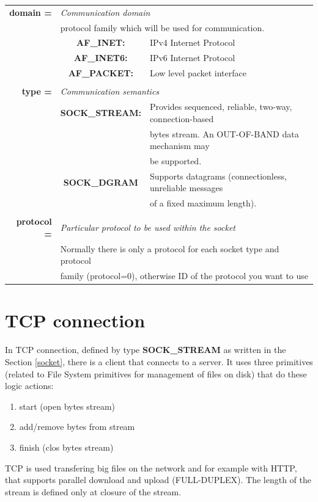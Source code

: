 \begin{table}[h]
\centering
\begin{tabular}{rcl}
\textbf{domain =} & \multicolumn{2}{l}{\textit{Communication domain}}\\
{} & \multicolumn{2}{l}{protocol family which will be used for communication.}\\
{} & \textbf{AF\_INET:} & {IPv4 Internet Protocol}\\
{} & \textbf{AF\_INET6:} & {IPv6 Internet Protocol}\\
{} & \textbf{AF\_PACKET:} & {Low level packet interface}\\
& &\\
\textbf{type =} & \multicolumn{2}{l}{\textit{Communication semantics}}\\
{} & \textbf{SOCK\_STREAM:} & {Provides sequenced, reliable, two-way, connection-based}\\
{} & {} & {bytes stream. An OUT-OF-BAND data mechanism may}\\
{} & {} & {be supported.}\\
{} & \textbf{SOCK\_DGRAM} & {Supports datagrams (connectionless, unreliable messages} \\
& & {of a fixed maximum length).}\\
& & \\
\textbf{protocol =} & \multicolumn{2}{l}{\textit{Particular protocol to be used within the socket}}\\
{} & \multicolumn{2}{l}{Normally there is only a protocol for each socket type and protocol}\\
{} & \multicolumn{2}{l}{family (protocol=0), otherwise ID of the protocol you want to use}\\
\end{tabular}
\end{table}

\vspace{10cm}
\section{TCP connection}
In TCP connection, defined by type \textbf{SOCK\_STREAM} as written in the Section \ref{socket}, there is a client that connects to a server. It uses three primitives (related to File System primitives for management of files on disk) that do these logic actions:
\begin{enumerate}
\item{start (open bytes stream)}
\item{add/remove bytes from stream}
\item{finish (clos bytes stream)}
\end{enumerate}
TCP is used transfering big files on the network and for example with HTTP, that supports parallel download and upload (FULL-DUPLEX). The length of the stream is defined only at closure of the stream.
 

